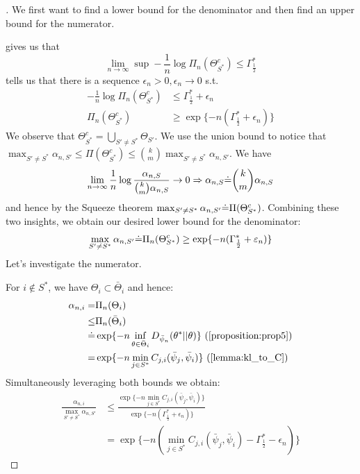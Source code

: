 \begin{proof}[]
  We first want to find a lower bound for the denominator and then find an upper
  bound for the numerator.

   gives us that
  \[\lim_{n \rightarrow \infty} \sup - \frac{1}{n} \log \Pi_n(\Theta^c_{S^*})
      \leq \Gamma^*_{\frac{1}{2}}\]
   tells us that there is a sequence $\epsilon_n > 0,
  \epsilon_n \rightarrow 0$ s.t.
  \begin{align}
    - \frac{1}{n} \log \Pi_n(\Theta^c_{S^*}) &\leq \Gamma^*_{\frac{1}{2}} +
        \epsilon_n \label{eq: epsilon}\\
   \Pi_n(\Theta^c_{S^*}) &\geq \exp\{-n (\Gamma^*_{\frac{1}{2}} + \epsilon_n)\}
  \end{align}
  We observe that $\Theta^c_{S^*} = \bigcup_{S' \neq S^*} \Theta_{S'}$. We use
  the union bound to notice that $ \max_{S' \neq S^*} \alpha_{n, S'} \leq
  \Pi(\Theta_{S^*}^c) \leq {k \choose m} \max_{S' \neq S^*} \alpha_{n, S'}$. We
  have \[\lim_{n \rightarrow \infty} \frac{1}{n} \log\frac{\alpha_{n, S}}{{k
  \choose m} \alpha_{n, S}} \rightarrow 0 \Rightarrow \alpha_{n, S} \dot{=} {k
  \choose m} \alpha_{n, S}\] and hence by the Squeeze theorem $\max_{S' \neq
  S^*} \alpha_{n, S'} \dot{=} \Pi(\Theta_{S^*}^c)$. Combining these two insights,
  we obtain our desired lower bound for the denominator:
  \[\max_{S' \neq S^*} \alpha_{n, S'} \dot{=} \Pi_n(\Theta^c_{S^*}) \geq \exp\{-n
      (\Gamma^*_{\frac{1}{2}} + \varepsilon_n)\}\]
  Let's investigate the numerator.

  For $i \notin S^*$, we have $\Theta_i \subset \bar{\Theta}_i$ and hence:
  \begin{align}
    \alpha_{n,i} =& \Pi_n(\Theta_i) \\
    \leq& \Pi_n(\bar{\Theta}_i) \\
    \deq& \exp\{-n \inf_{\theta \in \bar{\Theta}_i}
        D_{\bar{\psi}_n}(\theta^*||\theta)\} \text{
        (\Cref{proposition:prop5})}\\
    =& \exp\{-n \min_{j \in S^*} C_{j, i}(\bar{\psi}_j, \bar{\psi}_i)\} \text{
        (\Cref{lemma:kl_to_C}) } \label{eq: only_i}
  \end{align}
  Simultaneously leveraging both bounds we obtain:
  \begin{align}
    \frac{\alpha_{n, i}}{\max_{S' \neq S^*} \alpha_{n, S'}} &\leq \frac{\exp\{-
        n \min_{j \in S^*} C_{j, i}(\bar{\psi}_j, \bar{\psi}_i)\}}{ \exp\{-n
        (\Gamma^*_{\frac{1}{2}} + \epsilon_n)\}} \\
    &= \exp\{-n( \min_{j \in S^*} C_{j, i}(\bar{\psi}_j, \bar{\psi}_i) -
        \Gamma^*_{\frac{1}{2}} - \epsilon_n) \}
  \end{align}
\end{proof}
